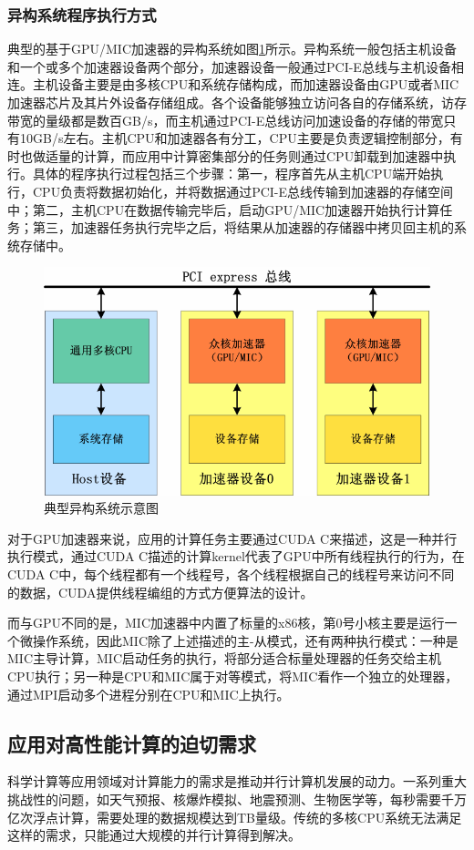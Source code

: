        \subsubsection{异构系统程序执行方式}
       典型的基于GPU/MIC加速器的异构系统如图\ref{fig:hybrid_sys}所示。异构系统一般包括主机设备和一个或多个加速器设备两个部分，加速器设备一般通过PCI-E总线与主机设备相连。主机设备主要是由多核CPU和系统存储构成，而加速器设备由GPU或者MIC加速器芯片及其片外设备存储组成。各个设备能够独立访问各自的存储系统，访存带宽的量级都是数百GB/s，而主机通过PCI-E总线访问加速设备的存储的带宽只有10GB/s左右。主机CPU和加速器各有分工，CPU主要是负责逻辑控制部分，有时也做适量的计算，而应用中计算密集部分的任务则通过CPU卸载到加速器中执行。具体的程序执行过程包括三个步骤：第一，程序首先从主机CPU端开始执行，CPU负责将数据初始化，并将数据通过PCI-E总线传输到加速器的存储空间中；第二，主机CPU在数据传输完毕后，启动GPU/MIC加速器开始执行计算任务；第三，加速器任务执行完毕之后，将结果从加速器的存储器中拷贝回主机的系统存储中。
        \begin{figure}[ht!]
	\centering
	\includegraphics[width=0.7\linewidth]{figs/hybrid_sys}
	\caption{典型异构系统示意图}
	\label{fig:hybrid_sys}
        \end{figure}
       
       对于GPU加速器来说，应用的计算任务主要通过CUDA C来描述，这是一种并行执行模式，通过CUDA C描述的计算kernel代表了GPU中所有线程执行的行为，在CUDA C中，每个线程都有一个线程号，各个线程根据自己的线程号来访问不同的数据，CUDA提供线程编组的方式方便算法的设计。
       
       而与GPU不同的是，MIC加速器中内置了标量的x86核，第0号小核主要是运行一个微操作系统，因此MIC除了上述描述的主-从模式，还有两种执行模式：一种是MIC主导计算，MIC启动任务的执行，将部分适合标量处理器的任务交给主机CPU执行；另一种是CPU和MIC属于对等模式，将MIC看作一个独立的处理器，通过MPI启动多个进程分别在CPU和MIC上执行。
       
 \subsection{应用对高性能计算的迫切需求}
 科学计算等应用领域对计算能力的需求是推动并行计算机发展的动力。一系列重大挑战性的问题，如天气预报、核爆炸模拟、地震预测、生物医学等，每秒需要千万亿次浮点计算，需要处理的数据规模达到TB量级。传统的多核CPU系统无法满足这样的需求，只能通过大规模的并行计算得到解决。
 
